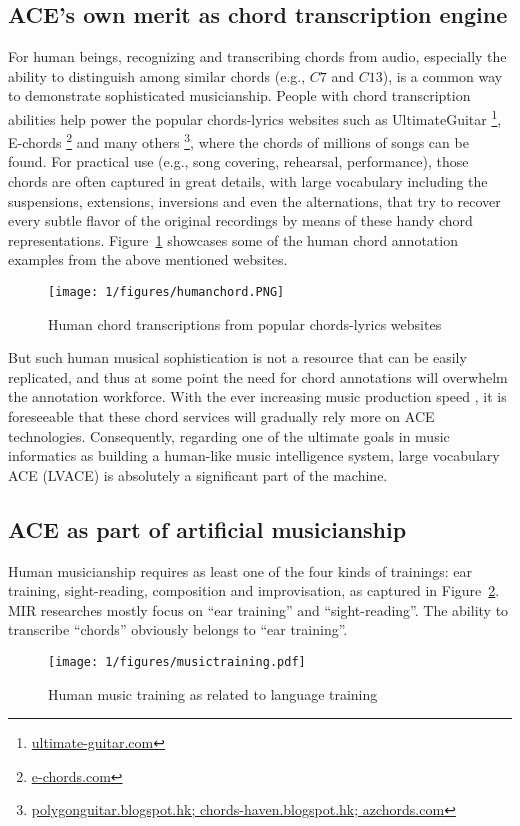 \subsection{ACE's own merit as chord transcription engine}
For human beings, recognizing and transcribing chords from audio, especially the ability to distinguish among similar chords (e.g., $C7$ and $C13$), is a common way to demonstrate sophisticated musicianship. People with chord transcription abilities help power the popular chords-lyrics websites such as UltimateGuitar \footnote{\url{ultimate-guitar.com}}, E-chords \footnote{\url{e-chords.com}} and many others \footnote{\url{polygonguitar.blogspot.hk; chords-haven.blogspot.hk; azchords.com}}, where the chords of millions of songs can be found. For practical use (e.g., song covering, rehearsal, performance), those chords are often captured in great details, with large vocabulary including the suspensions, extensions, inversions and even the alternations, that try to recover every subtle flavor of the original recordings by means of these handy chord representations. Figure~\ref{fig:1-humanchord} showcases some of the human chord annotation examples from the above mentioned websites.
\begin{figure}
\centering
\texttt{[image: 1/figures/humanchord.PNG]}
\caption{Human chord transcriptions from popular chords-lyrics websites}
\label{fig:1-humanchord}
\end{figure}

But such human musical sophistication is not a resource that can be easily replicated, and thus at some point the need for chord annotations will overwhelm the annotation workforce. With the ever increasing music production speed \cite{globalmusicreport}, it is foreseeable that these chord services will gradually rely more on ACE technologies. Consequently, regarding one of the ultimate goals in music informatics as building a human-like music intelligence system, large vocabulary ACE (LVACE) is absolutely a significant part of the machine.

\subsection{ACE as part of artificial musicianship}
Human musicianship requires as least one of the four kinds of trainings: ear training, sight-reading, composition and improvisation, as captured in Figure~\ref{fig:1-musictraining}. MIR researches mostly focus on ``ear training'' and ``sight-reading''. The ability to transcribe ``chords'' obviously belongs to ``ear training''.
\begin{figure}
\centering
\texttt{[image: 1/figures/musictraining.pdf]}
\caption{Human music training as related to language training}
\label{fig:1-musictraining}
\end{figure}

